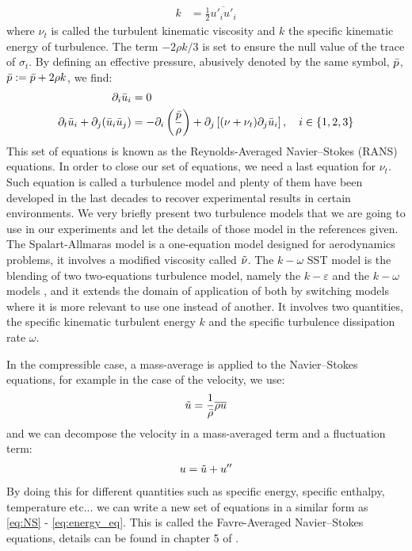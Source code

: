 \begin{subappendices}
\begin{align}
		k &= \frac{1}{2}\overline{u'_i u'_i}
	\end{align}
	where $\nu_t$ is called the turbulent kinematic viscosity and $k$ the specific kinematic energy of turbulence. The term $-2\rho k/3$ is set to ensure the null value of the trace of $\sigma_t$. By defining an effective pressure, abusively denoted by the same symbol, $\Bar{p}$, $\Bar{p} := \Bar{p} + 2\rho k$, we find:
	\begin{align}
		\partial_i \Bar{u}_i &= 0 \\
		\partial_t\Bar{u}_i + \partial_j(\Bar{u}_i\Bar{u}_j) &= -\partial_i\left(\frac{\Bar{p}}{\rho}\right) + \partial_{j}\left[(\nu + \nu_t)\partial_{j}\Bar{u}_i\right], \quad i\in\{1,2,3\}
	\end{align}
	This set of equations is known as the Reynolds-Averaged Navier–Stokes (RANS) equations. In order to close our set of equations, we need a last equation for $\nu_t$. Such equation is called a turbulence model and plenty of them have been developed in the last decades to recover experimental results in certain environments. We very briefly present two turbulence models that we are going to use in our experiments and let the details of those model in the references given. The Spalart-Allmaras model \cite{spalart} is a one-equation model designed for aerodynamics problems, it involves a modified viscosity called $\Tilde{\nu}$. The $k-\omega$ SST model \cite{SST} is the blending of two two-equations turbulence model, namely the $k-\varepsilon$ and the $k-\omega$ models \cite{kepsilon, komega}, and it extends the domain of application of both by switching models where it is more relevant to use one instead of another. It involves two quantities, the specific kinematic turbulent energy $k$ and the specific turbulence dissipation rate $\omega$.
	
	In the compressible case, a mass-average is applied to the Navier–Stokes equations, for example in the case of the velocity, we use:
	\begin{align}
		\Tilde{u} = \frac{1}{\Bar{\rho}}\overline{\rho u}
	\end{align}
	and we can decompose the velocity in a mass-averaged term and a fluctuation term:
	\begin{align}
		u = \Tilde{u} + u''
	\end{align}
	By doing this for different quantities such as specific energy, specific enthalpy, temperature etc... we can write a new set of equations in a similar form as \ref{eq:NS} - \ref{eq:energy_eq}. This is called the Favre-Averaged Navier–Stokes equations, details can be found in chapter 5 of \cite{wilcox}.
	

\end{subappendices}
